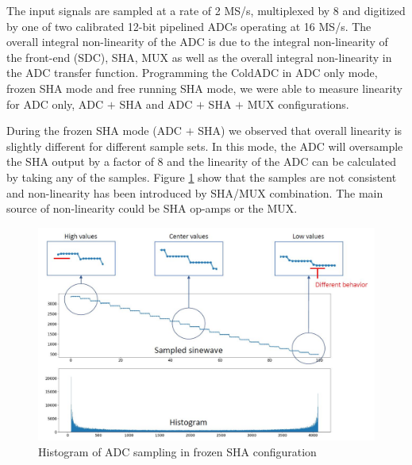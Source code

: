 \label{sec:5.4}


The input signals are sampled at a rate of 2 MS/s, multiplexed by 8 and digitized by one of two calibrated 12-bit pipelined ADCs operating at 16 MS/s. The overall integral non-linearity of the ADC is due to the integral non-linearity of the front-end (SDC), SHA, MUX as well as the overall integral non-linearity in the ADC transfer function. Programming the ColdADC in ADC only mode, frozen SHA mode and free running SHA mode, we were able to measure linearity for ADC only, ADC $+$ SHA and ADC $+$ SHA $+$ MUX configurations. 

During the frozen SHA mode (ADC $+$ SHA) we observed that overall linearity is slightly different for different sample sets. In this mode, the ADC will oversample the SHA output by a factor of 8 and the linearity of the ADC can be calculated by taking any of the samples. Figure \ref{fig:sha_sample_hist} show that the samples are not consistent and non-linearity has been introduced by SHA/MUX combination. The main source of non-linearity could be SHA op-amps or the MUX.
\begin{figure}[h!]
\centering
  \includegraphics[width=0.7\linewidth]{figures/prakash_fig/sha_sample_hist.JPG}
  \caption{Histogram of ADC sampling in frozen SHA configuration}
  \label{fig:sha_sample_hist}
\end{figure}


